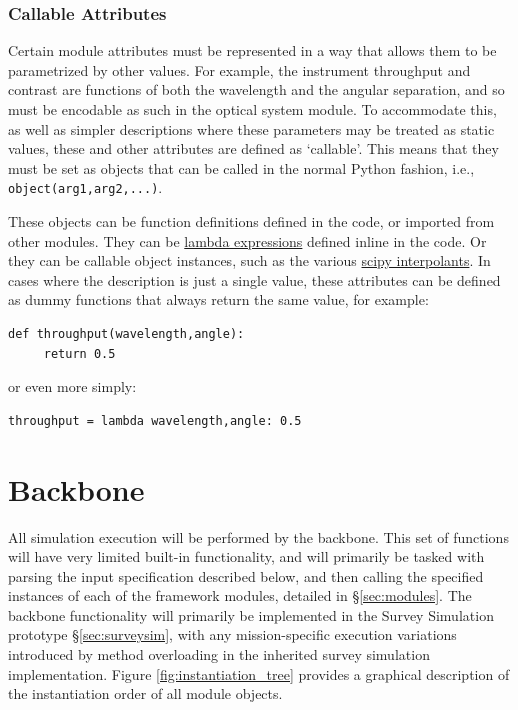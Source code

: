 \documentclass[cleanfoot]{asme2ej}
\newcommand{\reffig}[1]{Figure \ref{#1}}
\begin{document}
\subsubsection{Callable Attributes}
Certain module attributes must be represented in a way that allows them to be parametrized by other values.  For example, the instrument throughput and contrast are functions of both the wavelength and the angular separation, and so must be encodable as such in the optical system module.  To accommodate this, as well as simpler descriptions where these parameters may be treated as static values, these and other attributes are defined as `callable'.  This means that they must be set as objects that can be called in the normal Python fashion, i.e., \verb+object(arg1,arg2,...)+.  

These objects can be function definitions defined in the code, or imported from other modules.  They can be \href{https://docs.python.org/2/reference/expressions.html#lambda}{lambda expressions} defined inline in the code.  Or they can be callable object instances, such as the various \href{http://docs.scipy.org/doc/scipy/reference/interpolate.html}{scipy interpolants}.  In cases where the description is just a single value, these attributes can be defined as dummy functions that always return the same value, for example:
\begin{verbatim}
def throughput(wavelength,angle):
     return 0.5
\end{verbatim}
or even more simply:
\begin{verbatim}
throughput = lambda wavelength,angle: 0.5
\end{verbatim}

\section{Backbone}
All simulation execution will be performed by the backbone.  This set of functions will have very limited built-in functionality, and will primarily be tasked with parsing the input specification described below, and then calling the specified instances of each of the framework modules, detailed in \S\ref{sec:modules}.  The backbone functionality will primarily be implemented in the Survey Simulation prototype \S\ref{sec:surveysim}, with any mission-specific execution variations introduced by method overloading in the inherited survey simulation implementation. \reffig{fig:instantiation_tree} provides a graphical description of the instantiation order of all module objects.
\end{document}
